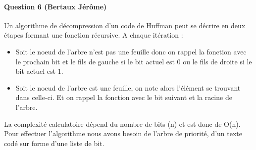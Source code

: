 \documentclass[a4paper]{article}
\begin{document}
\paragraph*{Question 6 (Bertaux Jérôme)}
Un algorithme de décompression d'un code de Huffman peut se décrire en deux étapes formant une fonction récursive. A chaque itération :
\begin{itemize}
\item Soit le noeud de l'arbre n'est pas une feuille donc on rappel la fonction avec le prochain bit et le fils de gauche si le bit actuel est 0 ou le fils de droite si le bit actuel est 1.
\item Soit le noeud de l'arbre est une feuille, on note alors l'élément se trouvant dans celle-ci. Et on rappel la fonction avec le bit suivant et la racine de l'arbre.
\end{itemize} 
La complexité calculatoire dépend du nombre de bits (n) et est donc de O(n). Pour effectuer l'algorithme nous avons besoin de l'arbre de priorité, d'un texte codé sur forme d'une liste de bit.
\end{document}
